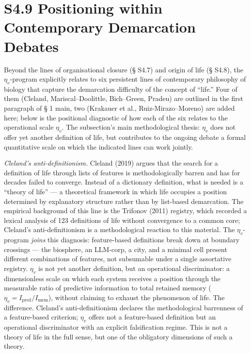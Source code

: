 \documentclass[pdflatex,sn-mathphys-ay]{sn-jnl}
\begin{document}
\section*{S4.9 Positioning within Contemporary Demarcation Debates}\label{s4.9-positioning-within-contemporary-demarcation-debates}

Beyond the lines of organisational closure (§ S4.7) and origin of life (§ S4.8), the \(\eta_v\)-program explicitly relates to six persistent lines of contemporary philosophy of biology that capture the demarcation difficulty of the concept of ``life.'' Four of them (Cleland, Mariscal--Doolittle, Bich--Green, Pradeu) are outlined in the first paragraph of § 1 main, two (Krakauer et al., Ruiz-Mirazo--Moreno) are added here; below is the positional diagnostic of how each of the six relates to the operational scale \(\eta_v\). The subsection's main methodological thesis: \(\eta_v\) does not offer yet another definition of life, but contributes to the ongoing debate a formal quantitative scale on which the indicated lines can work jointly.

\emph{Cleland's anti-definitionism.} Cleland (2019) argues that the search for a definition of life through lists of features is methodologically barren and has for decades failed to converge. Instead of a dictionary definition, what is needed is a ``theory of life'' --- a theoretical framework in which life occupies a position determined by explanatory structure rather than by list-based demarcation. The empirical background of this line is the Trifonov (2011) registry, which recorded a lexical analysis of 123 definitions of life without convergence to a common core; Cleland's anti-definitionism is a methodological reaction to this material. The \(\eta_v\)-program \emph{joins} this diagnosis: feature-based definitions break down at boundary crossings --- the biosphere, an LLM-corp, a city, and a minimal cell present different combinations of features, not subsumable under a single assortative registry. \(\eta_v\) is not yet another definition, but an operational discriminator: a dimensionless scale on which each system receives a position through the measurable ratio of predictive information to total retained memory (\(\eta_v = I_{\text{pred}}/I_{\text{mem}}\)), without claiming to exhaust the phenomenon of life. The difference. Cleland's anti-definitionism declares the methodological barrenness of a feature-based criterion; \(\eta_v\) offers not a feature-based definition but an operational discriminator with an explicit falsification regime. This is not a theory of life in the full sense, but one of the obligatory dimensions of such a theory.
\end{document}
